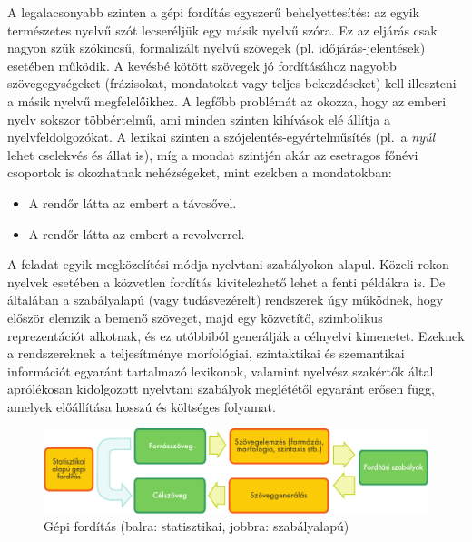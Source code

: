\begin{multicols}{2}
  A legalacsonyabb szinten a gépi fordítás egyszerű behelyettesítés: az egyik természetes nyelvű szót lecseréljük egy másik nyelvű szóra. Ez az eljárás csak nagyon szűk szókincsű, formalizált nyelvű szö\-ve\-gek (pl. időjárás-jelentések) esetében működik. A kevésbé kötött szövegek jó fordításához nagyobb szö\-veg\-egy\-sé\-ge\-ket (frá\-zi\-so\-kat, mon\-da\-to\-kat vagy teljes bekezdéseket) kell illeszteni a másik nyelvű megfelelőikhez. A legfőbb problémát az okozza, hogy az emberi nyelv sokszor többértelmű, ami minden szinten kihívások elé állítja a nyelvfeldolgozókat. A lexikai szinten a szójelentés-egyértelműsítés (pl.\ a \textit{nyúl} lehet cselekvés és állat is), míg a mondat szintjén akár az esetragos főnévi csoportok is okozhatnak nehézségeket, mint ezekben a mondatokban:

  \begin{itemize}
  \item A rendőr látta az embert a távcsővel. 
  \item A rendőr látta az embert a revolverrel.
  \end{itemize}

  A feladat egyik megközelítési módja nyelvtani szabályokon alapul. Közeli rokon nyelvek esetében a közvetlen fordítás kivitelezhető lehet a fenti példákra is. De általában a szabályalapú (vagy tu\-dás\-ve\-zé\-relt) rendszerek úgy működnek, hogy először elemzik a bemenő szöveget, majd egy közvetítő, szimbolikus reprezentációt alkotnak, és ez utóbbiból generálják a célnyelvi kimenetet. Ezeknek a rend\-sze\-rek\-nek a teljesítménye morfológiai, szintaktikai és szemantikai információt egyaránt tartalmazó lexikonok, valamint nyelvész szakértők által aprólékosan kidolgozott nyelvtani szabályok meglététől egyaránt erősen függ, amelyek előállítása hosszú és költséges folyamat.

  \begin{figure}[htb]
    \center
    \includegraphics[width=\textwidth]{../_media/hungarian/machine_translation}
    \caption{Gépi fordítás (balra: statisztikai, jobbra: szabályalapú)}
    \label{fig:mtarch_de}
  \end{figure}


\end{multicols}
